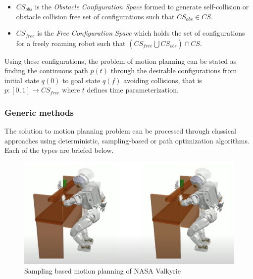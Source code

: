 \begin{itemize}
    \item $\mathit{CS_{obs}}$ is the \textit{Obstacle Configuration Space} formed to generate self-collision or obstacle collision free set of
     configurations such that $\mathit{CS_{obs}} \in \mathit{CS}$.
     \item $\mathit{CS_{free}}$ is the \textit{Free Configuration Space} which holds the set of configurations for a freely roaming robot such that 
     $(\mathit{CS_{free}} \bigcup \mathit{CS_{obs}}) \cap \mathit{CS} $.
\end{itemize}

Using these configurations, the problem of motion planning can be stated as finding the continuous path $p(t)$ through the desirable configurations from initial
state $q(0)$ to goal state $q(f)$ avoiding collisions, that is $p: [0, 1]  \rightarrow \mathit{CS_{free}}$ where $t$ defines time parameterization.


\subsubsection{Generic methods}

The solution to motion planning problem can be processed through classical approaches using deterministic, sampling-based or path optimization algorithms. 
Each of the types are briefed below.

\begin{figure}[h!]
    \centering
    \includegraphics[scale=0.3]{images/motion-planning.png}\hfill
    \caption{Sampling based motion planning of NASA Valkyrie \cite{Vijayakumar}}\hfill
    \label{motion-planning}
\end{figure}

